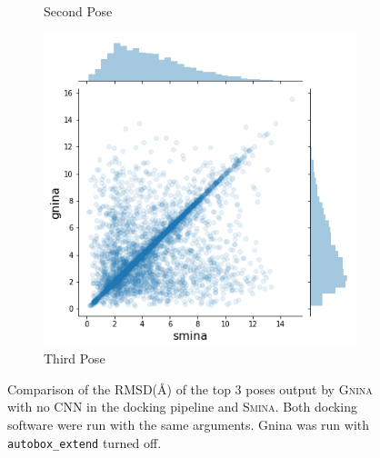 \documentclass[journal=jcisd8,manuscript=article]{achemso}
\begin{document}
\begin{figure}
\begin{subfigure}[b]{0.32\textwidth}
        \caption{Second Pose}
        \label{fig:SminaCompareTwo}
    \end{subfigure}
    \begin{subfigure}[b]{0.32\textwidth}
        \centering
        \includegraphics[width=\textwidth]{figures/other/thirdpose.png}
        \caption{Third Pose}
        \label{fig:SminaCompareThird}
    \end{subfigure}
    \caption{Comparison of the RMSD(\AA) of the top 3 poses output by \textsc{Gnina} with no CNN in the docking pipeline and \textsc{Smina}. Both docking software were run with the same arguments. Gnina was run with \texttt{autobox\_extend} turned off.}
    \label{fig:SminaComparePose}
\end{figure}
\end{document}
